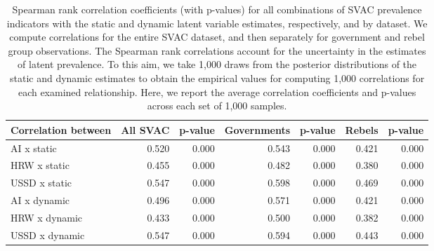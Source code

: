 \begin{table}[h]
\centering
\caption{Spearman rank correlation coefficients (with p-values) 
                              for all combinations of SVAC prevalence indicators with the static and dynamic latent 
                              variable estimates, respectively, 
                              and by dataset. We compute correlations for the entire SVAC dataset, and then separately  for  
                              government and rebel group observations.
                              The Spearman rank correlations account for the uncertainty in the estimates of latent prevalence.
                              To this aim, we take 1,000 draws from the posterior distributions of the static and dynamic estimates to obtain
                              the empirical values for computing 1,000 correlations for each examined relationship. Here, we report
                              the average  correlation coefficients and p-values across each set of 1,000 samples.} 
\label{xt-corr-spearman-obs-estimates}
\begin{tabular}{lrrrrrr}
  \hline
Correlation between & All SVAC & p-value & Governments & p-value & Rebels & p-value \\ 
  \hline
AI x static & 0.520 & 0.000 & 0.543 & 0.000 & 0.421 & 0.000 \\ 
  HRW x static & 0.455 & 0.000 & 0.482 & 0.000 & 0.380 & 0.000 \\ 
  USSD x static & 0.547 & 0.000 & 0.598 & 0.000 & 0.469 & 0.000 \\ 
   \hline
AI x dynamic & 0.496 & 0.000 & 0.571 & 0.000 & 0.421 & 0.000 \\ 
  HRW x dynamic & 0.433 & 0.000 & 0.500 & 0.000 & 0.382 & 0.000 \\ 
  USSD x dynamic & 0.547 & 0.000 & 0.594 & 0.000 & 0.443 & 0.000 \\ 
   \hline
\end{tabular}
\end{table}
